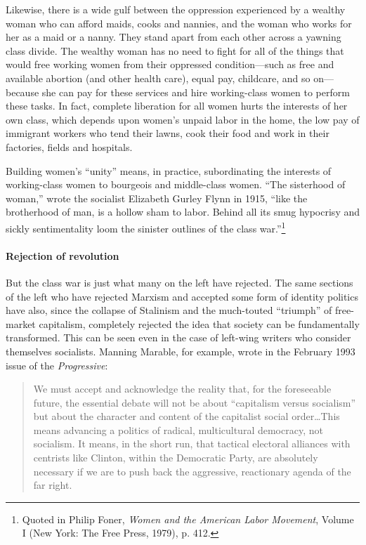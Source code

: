 Likewise, there is a wide gulf between the oppression experienced by a wealthy woman who can afford maids, cooks and nannies, and the woman who works for her as a maid or a nanny. They stand apart from each other across a yawning class divide. The wealthy woman has no need to fight for all of the things that would free working women from their oppressed condition---such as free and available abortion (and other health care), equal pay, childcare, and so on---because she can pay for these services and hire working-class women to perform these tasks. In fact, complete liberation for all women hurts the interests of her own class, which depends upon women's unpaid labor in the home, the low pay of immigrant workers who tend their lawns, cook their food and work in their factories, fields and hospitals.

Building women's ``unity'' means, in practice, subordinating the interests of working-class women to bourgeois and middle-class women. ``The sisterhood of woman,'' wrote the socialist Elizabeth Gurley Flynn in 1915, ``like the brotherhood of man, is a hollow sham to labor. Behind all its smug hypocrisy and sickly sentimentality loom the sinister outlines of the class war.''\footnote{Quoted in Philip Foner, \emph{Women and the American Labor Movement}, Volume I (New York: The Free Press, 1979), p. 412.}

\paragraph{Rejection of revolution}

But the class war is just what many on the left have rejected. The same sections of the left who have rejected Marxism and accepted some form of identity politics have also, since the collapse of Stalinism and the much-touted ``triumph'' of free-market capitalism, completely rejected the idea that society can be fundamentally transformed. This can be seen even in the case of left-wing writers who consider themselves socialists. Manning Marable, for example, wrote in the February 1993 issue of the \emph{Progressive}:

\blockquote{We must accept and acknowledge the reality that, for the foreseeable future, the essential debate will not be about ``capitalism versus socialism'' but about the character and content of the capitalist social order\ldots This means advancing a politics of radical, multicultural democracy, not socialism. It means, in the short run, that tactical electoral alliances with centrists like Clinton, within the Democratic Party, are absolutely necessary if we are to push back the aggressive, reactionary agenda of the far right.}

